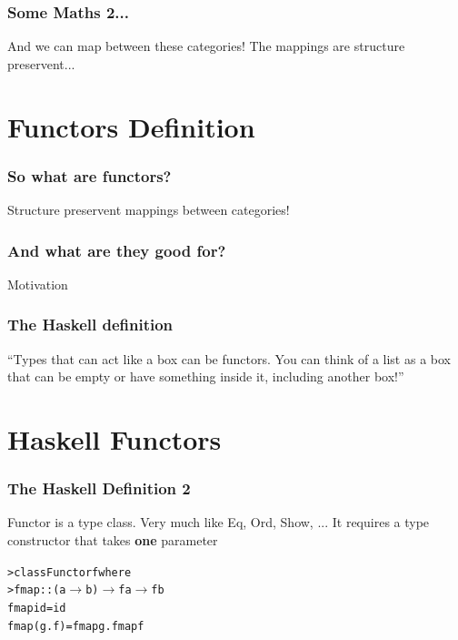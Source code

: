 \documentclass[12pt, xcolor=table]{beamer}
\begin{document}
\begin{frame}
    \frametitle{Some Maths 2...}
    And we can map between these categories!
    The mappings are structure preservent...
\end{frame}

\section{Functors Definition}
\begin{frame}
    \frametitle{So what are functors?}
    Structure preservent mappings between categories!
\end{frame}

\begin{frame}
    \frametitle{And what are they good for?}
    Motivation

\end{frame}

\begin{frame}
    \frametitle{The Haskell definition}
    ``Types that can act like a box can be functors. You can think of a list as a box that can be empty or have something inside it, including another box!''
\end{frame}

\section{Haskell Functors}
\begin{frame}
    \frametitle{The Haskell Definition 2}
    Functor is a type class. Very much like Eq, Ord, Show, ...
    It requires a type constructor that takes \textbf{one} parameter

    \begin{alltt}
        > class  Functor    f   where \\
        >       fmap         ::   (a $\to$ b) $\to$ f a $\to$ f b
               \newline
               \newline
        fmap id           =  id \\
        fmap (g . f)      =  fmap g . fmap f
    \end{alltt}
\end{frame}
\end{document}
